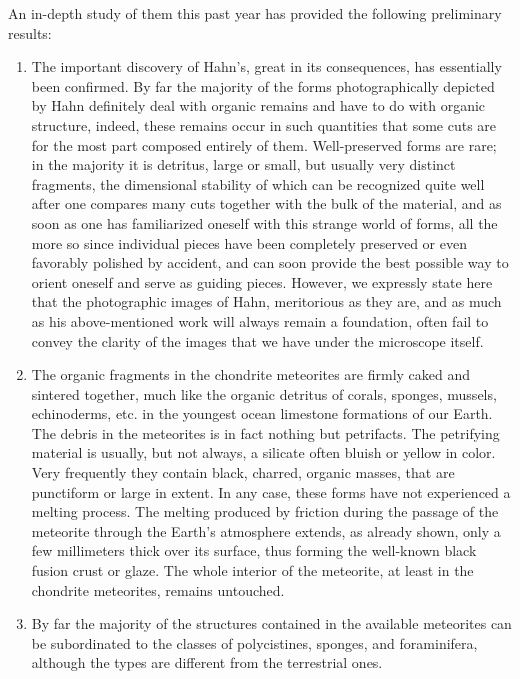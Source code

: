 \documentclass[a4paper, 12pt, oneside]{article}
\begin{document}
An in-depth study of them this past year has provided the following preliminary results:
\begin{enumerate}
\item The important discovery of Hahn's, great in its consequences, has essentially been confirmed. By far the majority of the forms photographically depicted by Hahn definitely deal with organic remains and have to do with organic structure, indeed, these remains occur in such quantities that some cuts are for the most part composed entirely of them. Well-preserved forms are rare; in the majority it is detritus, large or small, but usually very distinct fragments, the dimensional stability of which can be recognized quite well after one compares many cuts together with the bulk of the material, and as soon as one has familiarized oneself with this strange world of forms, all the more so since individual pieces have been completely preserved or even favorably polished by accident, and can soon provide the best possible way to orient oneself and serve as guiding pieces. However, we expressly state here that the photographic images of Hahn, meritorious as they are, and as much as his above-mentioned work will always remain a foundation, often fail to convey the clarity of the images that we have under the microscope itself.

\item The organic fragments in the chondrite meteorites are firmly caked and sintered together, much like the organic detritus of corals, sponges, mussels, echinoderms, etc. in the youngest ocean limestone formations of our Earth. The debris in the meteorites is in fact nothing but petrifacts. The petrifying material is usually, but not always, a silicate often bluish or yellow in color. Very frequently they contain black, charred, organic masses, that are punctiform or large in extent. In any case, these forms have not experienced a melting process. The melting produced by friction during the passage of the meteorite through the Earth's atmosphere extends, as already shown, only a few millimeters thick over its surface, thus forming the well-known black fusion crust or glaze. The whole interior of the meteorite, at least in the chondrite meteorites, remains untouched.

\item By far the majority of the structures contained in the available meteorites can be subordinated to the classes of polycistines, sponges, and foraminifera, although the types are different from the terrestrial ones.


\end{enumerate}
\end{document}
